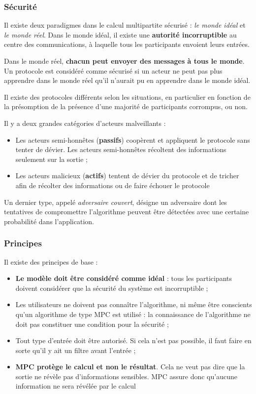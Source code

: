 \documentclass[12pt,a4paper]{article}
\begin{document}
\subsubsection{Sécurité}
Il existe deux paradigmes dans le calcul multipartite sécurisé : \textit{le monde idéal} et \textit{le monde réel}. Dans le monde idéal, il existe une \textbf{autorité incorruptible} au centre des communications, à laquelle tous les participants envoient leurs entrées.

Dans le monde réel, \textbf{chacun peut envoyer des messages à tous le monde}.
Un protocole est considéré comme sécurisé si un acteur ne peut pas plus apprendre dans le monde réel qu’il n'aurait pu en apprendre dans le monde idéal.

Il existe des protocoles différents selon les situations, en particulier en fonction de la présomption de la présence d'une majorité de participants corrompus, ou non.

Il y a deux grandes catégories d’acteurs malveillants :
\begin{itemize}
    \item Les acteurs semi-honnêtes (\textbf{passifs}) coopèrent et appliquent le protocole sans tenter de dévier. Les acteurs semi-honnêtes récoltent des informations seulement sur la sortie ;
    \item Les acteurs malicieux (\textbf{actifs}) tentent de dévier du protocole et de tricher afin de récolter des informations ou de faire échouer le protocole
\end{itemize}

Un dernier type, appelé \textit{adversaire couvert}, désigne un adversaire dont les tentatives de compromettre l'algorithme peuvent être détectées avec une certaine probabilité dans l'application.

\subsubsection{Principes}
Il existe des principes de base :
\begin{itemize}
    \item \textbf{Le modèle doit être considéré comme idéal} : tous les participants doivent considérer que la sécurité du système est incorruptible ;
    \item Les utilisateurs ne doivent pas connaître l'algorithme, ni même être conscients qu’un algorithme de type MPC est utilisé : la connaissance de l'algorithme ne doit pas constituer une condition pour la sécurité ;
    \item Tout type d’entrée doit être autorisé. Si cela n’est pas possible, il faut faire en sorte qu’il y ait un filtre avant l’entrée ;
    \item \textbf{MPC protège le calcul et non le résultat}. Cela ne veut pas dire que la sortie ne révèle pas d’informations sensibles. MPC assure donc qu’aucune information ne sera révélée par le calcul
\end{itemize}
\end{document}
